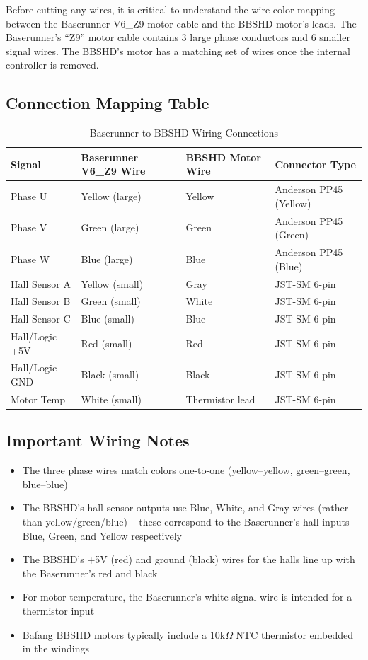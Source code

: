 \documentclass[11pt,a4paper]{article}
\begin{document}
Before cutting any wires, it is critical to understand the wire color mapping between the Baserunner V6\_Z9 motor cable and the BBSHD motor's leads. The Baserunner's ``Z9'' motor cable contains 3 large phase conductors and 6 smaller signal wires. The BBSHD's motor has a matching set of wires once the internal controller is removed.

\subsection{Connection Mapping Table}

\begin{table}[H]
\centering
\caption{Baserunner to BBSHD Wiring Connections}
\label{tab:wiring}
\begin{tabular}{p{2.5cm}p{3.5cm}p{3.5cm}p{3.5cm}}
\toprule
\textbf{Signal} & \textbf{Baserunner V6\_Z9 Wire} & \textbf{BBSHD Motor Wire} & \textbf{Connector Type} \\
\midrule
Phase U & Yellow (large) & Yellow & Anderson PP45 (Yellow) \\
Phase V & Green (large) & Green & Anderson PP45 (Green) \\
Phase W & Blue (large) & Blue & Anderson PP45 (Blue) \\
Hall Sensor A & Yellow (small) & Gray & JST-SM 6-pin \\
Hall Sensor B & Green (small) & White & JST-SM 6-pin \\
Hall Sensor C & Blue (small) & Blue & JST-SM 6-pin \\
Hall/Logic +5V & Red (small) & Red & JST-SM 6-pin \\
Hall/Logic GND & Black (small) & Black & JST-SM 6-pin \\
Motor Temp & White (small) & Thermistor lead & JST-SM 6-pin \\
\bottomrule
\end{tabular}
\end{table}

\subsection{Important Wiring Notes}

\begin{itemize}
    \item The three phase wires match colors one-to-one (yellow--yellow, green--green, blue--blue)
    \item The BBSHD's hall sensor outputs use Blue, White, and Gray wires (rather than yellow/green/blue) -- these correspond to the Baserunner's hall inputs Blue, Green, and Yellow respectively
    \item The BBSHD's +5V (red) and ground (black) wires for the halls line up with the Baserunner's red and black
    \item For motor temperature, the Baserunner's white signal wire is intended for a thermistor input
    \item Bafang BBSHD motors typically include a 10k$\Omega$ NTC thermistor embedded in the windings
\end{itemize}
\end{document}
